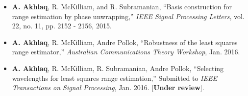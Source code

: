  \label{Publications}
\begin{itemize}
\item{\textbf{A. Akhlaq}, R. McKilliam, and R. Subramanian, ``Basis construction for range estimation by phase unwrapping,'' \textit{IEEE Signal Processing Letters}, vol. 22, no. 11, pp. 2152 - 2156, 2015.}
\item{\textbf{A. Akhlaq}, R. McKilliam, Andre Pollok, ``Robustness of the least squares range estimator,'' \textit{Australian Communications Theory Workshop}, Jan. 2016.}
\item{\textbf{A. Akhlaq}, R. McKilliam, R. Subramanian, Andre Pollok, ``Selecting wavelengths for least squares range estimation,'' Submitted to \textit{IEEE Transactions on Signal Processing}, Jan. 2016. [\textbf{Under review}].}
\end{itemize}